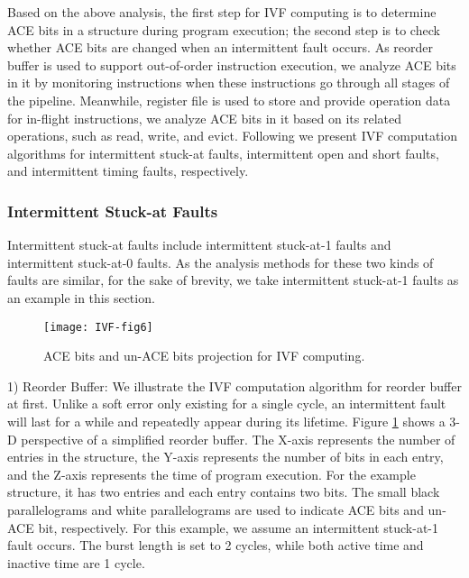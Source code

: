 Based on the above analysis, the first step for IVF computing is to determine ACE bits in a structure during program execution; the second step is to check whether ACE bits are changed when an intermittent fault occurs. As reorder buffer is used to support out-of-order instruction execution, we analyze ACE bits in it by monitoring instructions when these instructions go through all stages of the pipeline. Meanwhile, register file is used to store and provide operation data for in-flight instructions, we analyze ACE bits in it based on its related operations, such as read, write, and evict. Following we present IVF computation algorithms for intermittent stuck-at faults, intermittent open and short faults, and intermittent timing faults, respectively.

\subsubsection{Intermittent Stuck-at Faults}
Intermittent stuck-at faults include intermittent stuck-at-1 faults and intermittent stuck-at-0 faults. As the analysis methods for these two kinds of faults are similar, for the sake of brevity, we take intermittent stuck-at-1 faults as an example in this section.

\begin{figure}[t]
    \centering
    \texttt{[image: IVF-fig6]}\\
    \caption{ACE bits and un-ACE bits projection for IVF computing.}
    \label{fig:ACEbits}
\end{figure}

1) Reorder Buffer: We illustrate the IVF computation algorithm for reorder buffer at first. Unlike a soft error only existing for a single cycle, an intermittent fault will last for a while and repeatedly appear during its lifetime. Figure \ref{fig:ACEbits} shows a 3-D perspective of a simplified reorder buffer. The X-axis represents the number of entries in the structure, the Y-axis represents the number of bits in each entry, and the Z-axis represents the time of program execution. For the example structure, it has two entries and each entry contains two bits. The small black parallelograms and white parallelograms are used to indicate ACE bits and un-ACE bit, respectively. For this example, we assume an intermittent stuck-at-1 fault occurs. The burst length is set to 2 cycles, while both active time and inactive time are 1 cycle.

